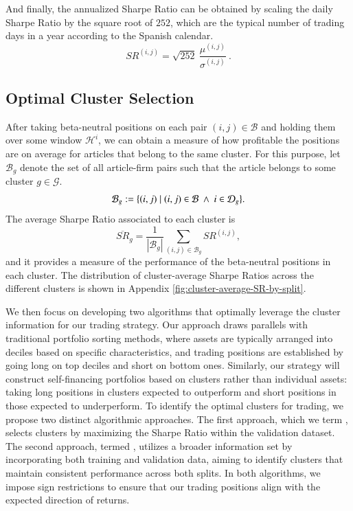 \mx 
And finally, the annualized Sharpe Ratio can be obtained by scaling the daily Sharpe Ratio by the square root of ${252}$, which are the typical number of trading days in a year according to the Spanish calendar. 
$$
SR^{(i,j)} =
\sqrt{252}~
\frac{
\mu^{(i,j)}
}{
\sigma^{(i,j)}
}
~.
$$
\subsection{Optimal Cluster Selection}

After taking beta-neutral positions on each pair $(i,j)\in\mathcal B$ and holding them over some window $\mathcal H^i$, we can obtain a measure of how profitable the positions are on average for articles that belong to the same cluster.
For this purpose, let $\mathcal{B}_g$ denote the set of all article-firm pairs such that the article belongs to some cluster $g\in\mathcal G$. 
$$
\mathcal{B}_g:= \{(i,j) \mid (i,j)\in\mathcal{B} ~\wedge~ i \in \mathcal{D}_g \}
.
$$
The average Sharpe Ratio associated to each cluster is
$$
\overline{S R}_g=\frac{1}{\left|\mathcal{B}_g\right|} \sum_{(i,j) \in \mathcal{B}_g} S R^{(i,j)}
,
$$
and it provides a measure of the performance of the beta-neutral positions in each cluster. 
%
%
The distribution of cluster-average Sharpe Ratios across the different clusters is shown in Appendix \cref{fig:cluster-average-SR-by-split}. 


\mx
We then focus on developing two algorithms that optimally leverage the cluster information for our trading strategy. Our approach draws parallels with traditional portfolio sorting methods, where assets are typically arranged into deciles based on specific characteristics, and trading positions are established by going long on top deciles and short on bottom ones. Similarly, our strategy will construct self-financing portfolios based on clusters rather than individual assets: taking long positions in clusters expected to outperform and short positions in those expected to underperform.
%
To identify the optimal clusters for trading, we propose two distinct algorithmic approaches. The first approach, which we term , selects clusters by maximizing the Sharpe Ratio within the validation dataset. The second approach, termed , utilizes a broader information set by incorporating both training and validation data, aiming to identify clusters that maintain consistent performance across both splits. In both algorithms, we impose sign restrictions to ensure that our trading positions align with the expected direction of returns.


